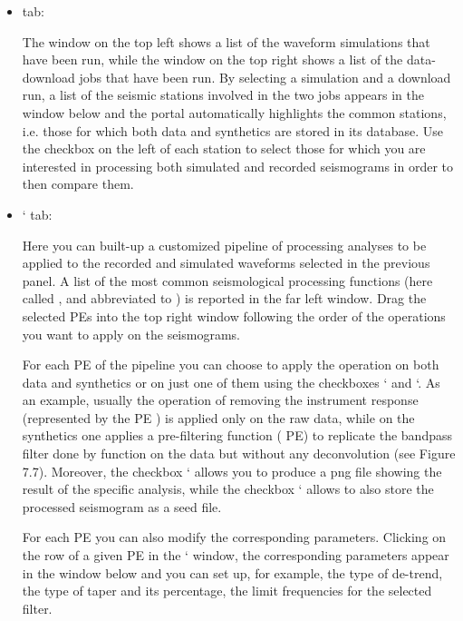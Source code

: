 \documentclass[english]{book}
\begin{document}
\begin{itemize}
\item {} 
 tab:

The window on the top left shows a list of the waveform simulations that
have been run, while the window on the top right shows a list of the
data-download jobs that have been run. By selecting a simulation and a
download run, a list of the seismic stations involved in the two jobs
appears in the window below and the portal automatically highlights the
common stations, i.e. those for which both data and synthetics are
stored in its database. Use the checkbox on the left of each station to
select those for which you are interested in processing both simulated
and recorded seismograms in order to then compare them.

\item {} 
‘ tab:

Here you can built-up a customized pipeline of processing analyses to be
applied to the recorded and simulated waveforms selected in the previous
panel. A list of the most common seismological processing functions
(here called , and abbreviated to ) is
reported in the far left window. Drag the selected PEs into the top
right window following the order of the operations you want to apply on
the seismograms.

For each PE of the pipeline you can choose to apply the operation on
both data and synthetics or on just one of them using the checkboxes
‘ and ‘. As an example, usually the operation of
removing the instrument response (represented by the PE
) is applied only on the raw data, while on the
synthetics one applies a pre-filtering function ( PE) to
replicate the bandpass filter done by  function on the
data but without any deconvolution (see Figure 7.7). Moreover, the
checkbox ‘ allows you to produce a png file showing the result
of the specific analysis, while the checkbox ‘ allows to also
store the processed seismogram as a seed file.

For each PE you can also modify the corresponding parameters. Clicking
on the row of a given PE in the ‘ window, the
corresponding parameters appear in the window below and you can set up,
for example, the type of de-trend, the type of taper and its percentage,
the limit frequencies for the selected filter.


\end{itemize}
\end{document}
